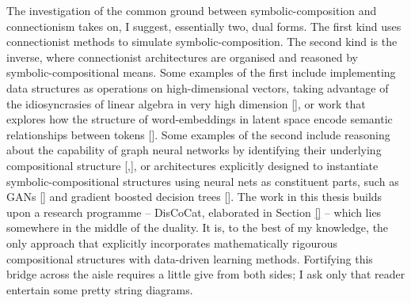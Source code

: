 The investigation of the common ground between symbolic-composition and connectionism takes on, I suggest, essentially two, dual forms. The first kind uses connectionist methods to simulate symbolic-composition. The second kind is the inverse, where connectionist architectures are organised and reasoned by symbolic-compositional means. Some examples of the first include implementing data structures as operations on high-dimensional vectors, taking advantage of the idiosyncrasies of linear algebra in very high dimension [], or work that explores how the structure of word-embeddings in latent space encode semantic relationships between tokens []. Some examples of the second include reasoning about the capability of graph neural networks by identifying their underlying compositional structure [,], or architectures explicitly designed to instantiate symbolic-compositional structures using neural nets as constituent parts, such as GANs [] and gradient boosted decision trees []. The work in this thesis builds upon a research programme -- DisCoCat, elaborated in Section \ref{} -- which lies somewhere in the middle of the duality. It is, to the best of my knowledge, the only approach that explicitly incorporates mathematically rigourous compositional structures with data-driven learning methods. Fortifying this bridge across the aisle requires a little give from both sides; I ask only that reader entertain some pretty string diagrams.


